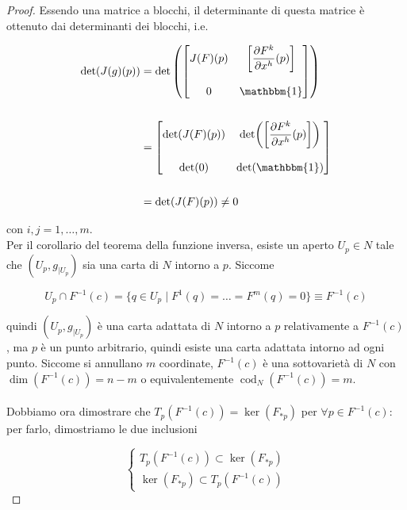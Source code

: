 \begin{proof}
	Essendo una matrice a blocchi, il determinante di questa matrice è ottenuto dai determinanti dei blocchi, i.e.
	
	\begin{align}
		\begin{split}
			\det(J(g)(p)) &= \det \left( \begin{bmatrix} J(F)(p) & \left[ \dfrac{\partial F^{k}}{\partial x^{h}} (p) \right] \\\\ 0 & \mathbbm{1} \end{bmatrix} \right)\\\\
			&= \begin{bmatrix} \det(J(F)(p)) & \det( \left[ \dfrac{\partial F^{k}}{\partial x^{h}} (p) \right] ) \\\\ \det(0) & \det(\mathbbm{1}) \end{bmatrix}\\\\
			&= \det(J(F)(p)) \neq 0
		\end{split}
	\end{align}

	con $ i,j=1,\dots,m $.\\
	Per il corollario del teorema della funzione inversa, esiste un aperto $ U_{p} \in N $ tale che $ (U_{p},g_{|U_{p}}) $ sia una carta di $ N $ intorno a $ p $. Siccome
	
	\begin{equation}
		U_{p} \cap F^{-1}(c) = \{ q \in U_{p} \mid F^{1}(q) = \dots = F^{m}(q) = 0 \} \equiv F^{-1}(c)
	\end{equation}

	quindi $ (U_{p},g_{|U_{p}}) $ è una carta adattata di $ N $ intorno a $ p $ relativamente a $ F^{-1}(c) $, ma $ p $ è un punto arbitrario, quindi esiste una carta adattata intorno ad ogni punto. Siccome si annullano $ m $ coordinate, $ F^{-1}(c) $ è una sottovarietà di $ N $ con $ \dim(F^{-1}(c)) = n-m $ o equivalentemente $ \operatorname{cod}_{N}(F^{-1}(c)) = m $.\\\\
	Dobbiamo ora dimostrare che $ T_{p}(F^{-1}(c)) = \ker(F_{*p}) $ per $ \forall p \in F^{-1}(c) $: per farlo, dimostriamo le due inclusioni
	
	\begin{equation}
		\begin{cases}
			T_{p}(F^{-1}(c)) \subset \ker(F_{*p})\\
			\ker(F_{*p}) \subset T_{p}(F^{-1}(c))
		\end{cases}
	\end{equation}
	

\end{proof}
